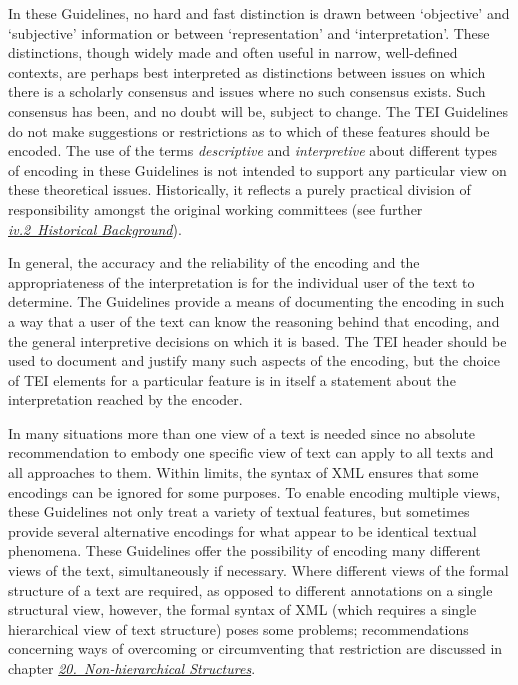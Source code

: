 In these Guidelines, no hard and fast distinction is drawn between ‘objective’ and ‘subjective’ information or between ‘representation’ and ‘interpretation’. These distinctions, though widely made and often useful in narrow, well-defined contexts, are perhaps best interpreted as distinctions between issues on which there is a scholarly consensus and issues where no such consensus exists. Such consensus has been, and no doubt will be, subject to change. The TEI Guidelines do not make suggestions or restrictions as to which of these features should be encoded. The use of the terms \textit{descriptive} and \textit{interpretive} about different types of encoding in these Guidelines is not intended to support any particular view on these theoretical issues. Historically, it reflects a purely practical division of responsibility amongst the original working committees (see further \textit{\hyperref[ABTEI]{iv.2\ Historical Background}}).\par
In general, the accuracy and the reliability of the encoding and the appropriateness of the interpretation is for the individual user of the text to determine. The Guidelines provide a means of documenting the encoding in such a way that a user of the text can know the reasoning behind that encoding, and the general interpretive decisions on which it is based. The TEI header should be used to document and justify many such aspects of the encoding, but the choice of TEI elements for a particular feature is in itself a statement about the interpretation reached by the encoder.\par
In many situations more than one view of a text is needed since no absolute recommendation to embody one specific view of text can apply to all texts and all approaches to them. Within limits, the syntax of XML ensures that some encodings can be ignored for some purposes. To enable encoding multiple views, these Guidelines not only treat a variety of textual features, but sometimes provide several alternative encodings for what appear to be identical textual phenomena. These Guidelines offer the possibility of encoding many different views of the text, simultaneously if necessary. Where different views of the formal structure of a text are required, as opposed to different annotations on a single structural view, however, the formal syntax of XML (which requires a single hierarchical view of text structure) poses some problems; recommendations concerning ways of overcoming or circumventing that restriction are discussed in chapter \textit{\hyperref[NH]{20.\ Non-hierarchical Structures}}.\par
